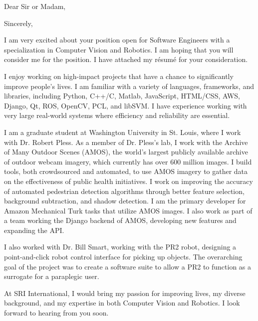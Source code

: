 \documentclass[10pt,a4paper,sans]{moderncv}
\makeatletter
\renewcommand*{\makeletterclosing}{
  \@closing\\[1em]%
  {\large \bfseries \@firstname~\@lastname}%
  \ifthenelse{\isundefined{\@enclosure}}{}{%
    \\%
    \vfill%
    {\color{color2}\itshape\enclname: \@enclosure}}}
\makeatother
\begin{document}

\date{January 27, 2015}
\opening{Dear Sir or Madam,} %
\closing{Sincerely,}

\makelettertitle
\vspace{-1em}
\justify
I am very excited about your position open for Software Engineers with a specialization in Computer Vision and Robotics. I am hoping that you will consider me for the position. I have attached my r\'esum\'e for your consideration.

\vspace{1em}

I enjoy working on high-impact projects that have a chance to significantly improve people's lives. I am familiar with a variety of languages, frameworks, and libraries, including Python, C++/C, Matlab, JavaScript, HTML/CSS, AWS, Django, Qt, ROS, OpenCV, PCL, and libSVM.  I have experience working with very large real-world systems where efficiency and reliability are essential.

\vspace{1em}

I am a graduate student at Washington University in St. Louis, where I work with Dr. Robert Pless. As a member of Dr. Pless's lab, I work with the Archive of Many Outdoor Scenes (AMOS), the world's largest publicly available archive of outdoor webcam imagery, which currently has over 600 million images. I build tools, both crowdsourced and automated, to use AMOS imagery to gather data on the effectiveness of public health initiatives. I work on improving the accuracy of automated pedestrian detection algorithms through better feature selection, background subtraction, and shadow detection.  I am the primary developer for Amazon Mechanical Turk tasks that utilize AMOS images. I also work as part of a team working the Django backend of AMOS, developing new features and expanding the API. 

\vspace{1em}

I also worked with Dr. Bill Smart, working with the PR2 robot, designing a point-and-click robot control interface for picking up objects. The overarching goal of the project was to create a software suite to allow a PR2 to function as a surrogate for a paraplegic user. 



\vspace{1em}

At SRI International, I would bring my passion for improving lives, my diverse background, and my expertise in both Computer Vision and Robotics. I look forward to hearing from you soon.

\vspace{1em}

\makeletterclosing
\end{document}
